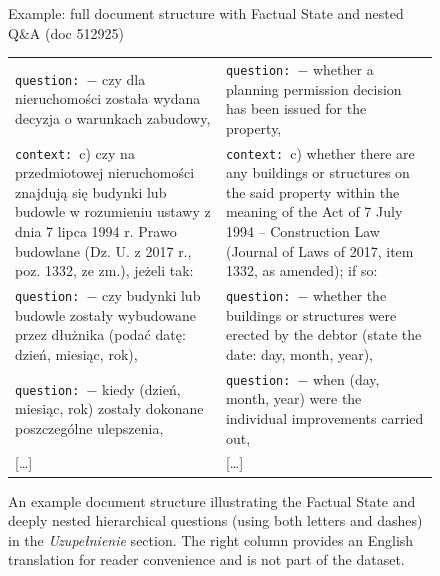 \begin{figure}[!htb]
\begin{examplebox}{Example: full document structure with Factual State and nested Q\&A (doc 512925)}
\begin{tabularx}{\linewidth}{@{}>{\raggedright\arraybackslash}X@{\hspace{1em}}>{\raggedright\arraybackslash}X@{}}
\hspace{1em} \texttt{question:}~$-$ czy dla nieruchomości została wydana decyzja o warunkach zabudowy, &
\hspace{1em} \texttt{question:}~$-$ whether a planning permission decision has been issued for the property, \\
\addlinespace

\texttt{context:}~c) czy na przedmiotowej nieruchomości znajdują się budynki lub budowle w rozumieniu ustawy z dnia 7 lipca 1994 r. Prawo budowlane (Dz. U. z 2017 r., poz. 1332, ze zm.), jeżeli tak: &
\texttt{context:}~c) whether there are any buildings or structures on the said property within the meaning of the Act of 7 July 1994 -- Construction Law (Journal of Laws of 2017, item 1332, as amended); if so: \\
\addlinespace

\hspace{1em} \texttt{question:}~$-$ czy budynki lub budowle zostały wybudowane przez dłużnika (podać datę: dzień, miesiąc, rok), &
\hspace{1em} \texttt{question:}~$-$ whether the buildings or structures were erected by the debtor (state the date: day, month, year), \\
\addlinespace

\hspace{1em} \texttt{question:}~$-$ kiedy (dzień, miesiąc, rok) zostały dokonane poszczególne ulepszenia, &
\hspace{1em} \texttt{question:}~$-$ when (day, month, year) were the individual improvements carried out, \\

\addlinespace

\hspace{1em} [\dots] &
\hspace{1em} [\dots] \\
\bottomrule
\end{tabularx}
\end{examplebox}
\caption{An example document structure illustrating the Factual State and deeply nested hierarchical questions (using both letters and dashes) in the \textit{Uzupełnienie} section. The right column provides an English translation for reader convenience and is not part of the dataset.}
\label{fig:document-example}
\end{figure}

